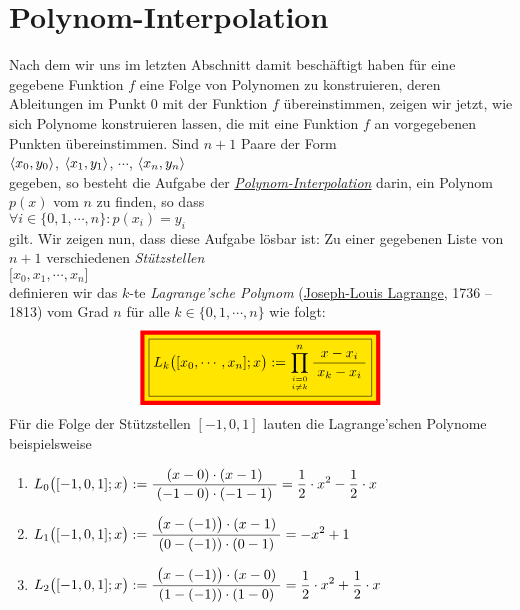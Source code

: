 \section{Polynom-Interpolation}
Nach dem wir uns im letzten Abschnitt damit besch\"aftigt haben f\"ur eine gegebene Funktion
$f$ eine Folge von Polynomen zu konstruieren, deren Ableitungen im Punkt $0$ mit der
Funktion $f$ \"ubereinstimmen, zeigen wir jetzt, wie sich Polynome konstruieren lassen, die
mit eine Funktion $f$ an vorgegebenen Punkten \"ubereinstimmen.  Sind $n+1$ Paare der Form
\\[0.2cm]
\hspace*{1.3cm}
$\pair(x_0,y_0)$,
$\pair(x_1,y_1)$,
$\cdots$,
$\pair(x_n,y_n)$
\\[0.2cm]
gegeben, so besteht die Aufgabe der
\href{https://de.wikipedia.org/wiki/Interpolation_(Mathematik)}{\emph{Polynom-Interpolation}} darin,
ein Polynom $p(x)$ vom  $n$ zu finden, so dass
\\[0.2cm]
\hspace*{1.3cm}
$\forall i \in \{0,1,\cdots,n\}: p(x_i) = y_i$
\\[0.2cm]
gilt.  Wir zeigen nun, dass diese Aufgabe l\"osbar ist:  Zu einer gegebenen Liste von 
$n+1$ verschiedenen \emph{St\"utzstellen} 
\\[0.2cm]
\hspace*{1.3cm}
$\bigl[x_0, x_1, \cdots, x_n]$
\\[0.2cm]
definieren wir das $k$-te \emph{Lagrange'sche Polynom} 
(\href{https://de.wikipedia.org/wiki/Joseph-Louis_Lagrange}{Joseph-Louis Lagrange}, 1736 -- 1813)
vom Grad $n$ f\"ur alle $k\in\{0,1,\cdots,n\}$ wie folgt: 
\begin{equation}
  \label{eq:lagrangePolynom}
\colorbox{red}{\colorbox{orange}{\framebox{$\ds L_k\bigl([x_0,\cdots,x_n];x\bigr) := \prod\limits_{i=0 \atop i\not=k}^n \bruch{x-x_i}{x_k-x_i}$}}}
\end{equation}
F\"ur die Folge der St\"utzstellen $[-1,0,1]$ lauten die Lagrange'schen Polynome beispielsweise
\begin{enumerate}
\item $L_0\bigl([-1,0,1];x\bigr) := \displaystyle\frac{\;\displaystyle(x-0)\cdot (x-1)\;}{\;\displaystyle(-1-0)\cdot (-1-1)\;} = 
       \frac{1}{2}\cdot x^2 - \frac{1}{2}\cdot x$ 
\item $L_1\bigl([-1,0,1];x\bigr) := \displaystyle\frac{\;\displaystyle\bigl(x-(-1)\bigr)\cdot (x-1)\;}{\;\displaystyle(0-(-1))\cdot (0-1)\;} = -x^2 + 1$
\item $L_2\bigl([-1,0,1];x\bigr) := \displaystyle\frac{\;\displaystyle\bigl(x-(-1)\bigr)\cdot (x-0)\;}{\;\displaystyle(1-(-1))\cdot (1-0)\;} = \frac{1}{2}\cdot x^2 + \frac{1}{2}\cdot x$
\end{enumerate}
